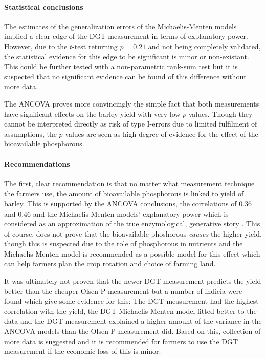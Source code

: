 \documentclass[11pt,fleqn]{article}
\begin{document}
\paragraph{Statistical conclusions} The estimates of the generalization errors of the Michaelis-Menten models implied a clear edge of the DGT measurement in terms of explanatory power. 
However, due to the \(t\)-test returning \(p=0.21\) and not being completely validated, the statistical evidence for this edge to be significant is minor or non-existant. This could be further tested with a non-parametric rank-sum test but it is suspected that no significant evidence can be found of this difference without more data.

The ANCOVA proves more convincingly the simple fact that both measurements have significant effects on the barley yield with very low \(p\)-values. 
Though they cannot be interpreted directly as risk of type I-errors due to limited fulfilment of assumptions, the \(p\)-values are seen as high degree of evidence for the effect of the bioavailable phosphorous.

\paragraph{Recommendations} The first, clear recommendation is that no matter what measurement technique the farmers use, the amount of bioavailable phosphorous is linked to yield of barley. 
This is supported by the ANCOVA conclusions, the correlations of 0.36 and 0.46 and the Michaelis-Menten models' explanatory power which is considered as an approximation of the true enzymological, generative story \cite{michment}. 
This of course, does not prove that the bioavailable phoshorous \textit{causes} the higher yield, though this is suspected due to the role of phosphorous in nutrients and the Michaelis-Menten model is recommended as a possible model for this effect which can help farmers plan the crop rotation and choice of farming land.

It was ultimately not proven that the newer DGT measurement predicts the yield better than the cheaper Olsen P-measurement but a number of indicia were found which give some evidence for this: The DGT measurement had the highest correlation with the yield, the DGT Michaelis-Menten model fitted better to the data and the DGT measurement explained a higher amount of the variance in the ANCOVA models than the Olsen-P measurement did.
Based on this, collection of more data is suggested and it is recommended for farmers to use the DGT measurement if the economic loss of this is minor. 
\end{document}
